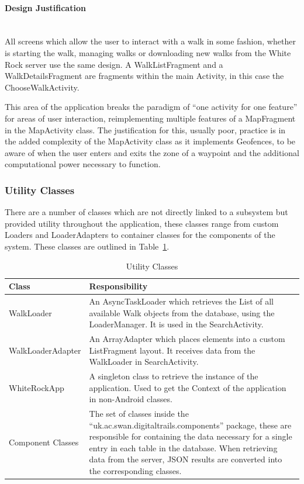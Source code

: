 \documentclass[11pt,a4paper]{report}
\begin{document}
\paragraph*{Design Justification}\mbox{}\\ 
All screens which allow the user to interact with a walk in some fashion, whether is starting the walk, managing walks or downloading new walks from the White Rock server use the same design. A WalkListFragment and a WalkDetailsFragment are fragments within the main Activity, in this case the ChooseWalkActivity. 

This area of the application breaks the paradigm of ``one activity for one feature'' for areas of user interaction, reimplementing multiple features of a MapFragment in the MapActivity class. The justification for this, usually poor, practice is in the added complexity of the MapActivity class as it implements Geofences, to be aware of when the user enters and exits the zone of a waypoint and the additional computational power necessary to function.

\subsubsection{Utility Classes}
There are a number of classes which are not directly linked to a subsystem but provided utility throughout the application, these classes range from custom Loaders and LoaderAdapters to container classes for the components of the system. These classes are outlined in Table~\ref{tab:utilityClasses}.

\begin{longtable}{|p{5cm}|p{10cm}|}
\hline \caption{Utility Classes - Cont. on Next Page} \endfoot
\hline \caption{Utility Classes} \label{tab:utilityClasses} \endlastfoot 
\hline
\textbf{Class} & \textbf{Responsibility} \\ \hline
WalkLoader & An AsyncTaskLoader which retrieves the List of all available Walk objects from the database, using the LoaderManager. It is used in the SearchActivity. \\ \hline
WalkLoaderAdapter & An ArrayAdapter which places elements into a custom ListFragment layout. It receives data from the WalkLoader in SearchActivity. \\ \hline
WhiteRockApp & A singleton class to retrieve the instance of the application. Used to get the Context of the application in non-Android classes. \\ \hline
Component Classes & The set of classes inside the ``uk.ac.swan.digitaltrails.components'' package, these are responsible for containing the data necessary for a single entry in each table in the database. When retrieving data from the server, JSON results are converted into the corresponding classes. \\ \hline 
\end{longtable}
\end{document}
